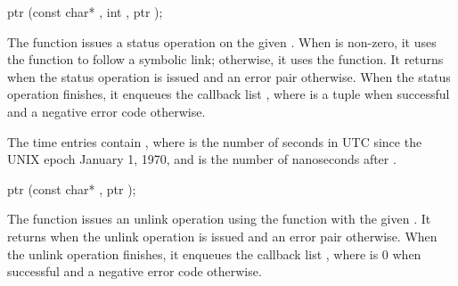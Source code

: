 \begin{function}
  ptr (const char* , int , ptr );
\end{function}

The  function issues a status operation on the
given . When  is non-zero, it uses the
 function to follow a symbolic link; otherwise, it
uses the  function. It returns  when the
status operation is issued and an error pair otherwise. When the
status operation finishes, it enqueues the callback list
, where  is a
 tuple when successful and a negative error code
otherwise.

\begin{tuple}\end{tuple}\antipar
\begin{argtbl}
\end{argtbl}

The time entries contain , where
 is the number of seconds in UTC since the UNIX epoch January
1, 1970, and  is the number of nanoseconds after .

\begin{function}
  ptr (const char* , ptr );
\end{function}

The  function issues an unlink operation using the
 function with the given . It returns
 when the unlink operation is issued and an error pair
otherwise. When the unlink operation finishes, it enqueues the
callback list , where 
is 0 when successful and a negative error code otherwise.

